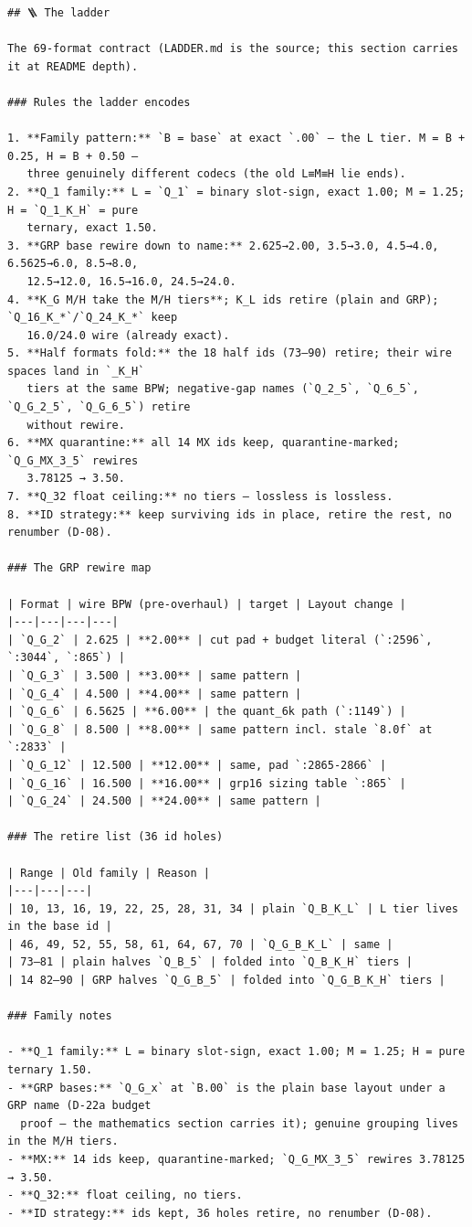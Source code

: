 \begin{Verbatim}[breaklines,breakanywhere,fontsize=\footnotesize]
## 🪜 The ladder

The 69-format contract (LADDER.md is the source; this section carries it at README depth).

### Rules the ladder encodes

1. **Family pattern:** `B = base` at exact `.00` — the L tier. M = B + 0.25, H = B + 0.50 —
   three genuinely different codecs (the old L≡M≡H lie ends).
2. **Q_1 family:** L = `Q_1` = binary slot-sign, exact 1.00; M = 1.25; H = `Q_1_K_H` = pure
   ternary, exact 1.50.
3. **GRP base rewire down to name:** 2.625→2.00, 3.5→3.0, 4.5→4.0, 6.5625→6.0, 8.5→8.0,
   12.5→12.0, 16.5→16.0, 24.5→24.0.
4. **K_G M/H take the M/H tiers**; K_L ids retire (plain and GRP); `Q_16_K_*`/`Q_24_K_*` keep
   16.0/24.0 wire (already exact).
5. **Half formats fold:** the 18 half ids (73–90) retire; their wire spaces land in `_K_H`
   tiers at the same BPW; negative-gap names (`Q_2_5`, `Q_6_5`, `Q_G_2_5`, `Q_G_6_5`) retire
   without rewire.
6. **MX quarantine:** all 14 MX ids keep, quarantine-marked; `Q_G_MX_3_5` rewires
   3.78125 → 3.50.
7. **Q_32 float ceiling:** no tiers — lossless is lossless.
8. **ID strategy:** keep surviving ids in place, retire the rest, no renumber (D-08).

### The GRP rewire map

| Format | wire BPW (pre-overhaul) | target | Layout change |
|---|---|---|---|
| `Q_G_2` | 2.625 | **2.00** | cut pad + budget literal (`:2596`, `:3044`, `:865`) |
| `Q_G_3` | 3.500 | **3.00** | same pattern |
| `Q_G_4` | 4.500 | **4.00** | same pattern |
| `Q_G_6` | 6.5625 | **6.00** | the quant_6k path (`:1149`) |
| `Q_G_8` | 8.500 | **8.00** | same pattern incl. stale `8.0f` at `:2833` |
| `Q_G_12` | 12.500 | **12.00** | same, pad `:2865-2866` |
| `Q_G_16` | 16.500 | **16.00** | grp16 sizing table `:865` |
| `Q_G_24` | 24.500 | **24.00** | same pattern |

### The retire list (36 id holes)

| Range | Old family | Reason |
|---|---|---|
| 10, 13, 16, 19, 22, 25, 28, 31, 34 | plain `Q_B_K_L` | L tier lives in the base id |
| 46, 49, 52, 55, 58, 61, 64, 67, 70 | `Q_G_B_K_L` | same |
| 73–81 | plain halves `Q_B_5` | folded into `Q_B_K_H` tiers |
| 14 82–90 | GRP halves `Q_G_B_5` | folded into `Q_G_B_K_H` tiers |

### Family notes

- **Q_1 family:** L = binary slot-sign, exact 1.00; M = 1.25; H = pure ternary 1.50.
- **GRP bases:** `Q_G_x` at `B.00` is the plain base layout under a GRP name (D-22a budget
  proof — the mathematics section carries it); genuine grouping lives in the M/H tiers.
- **MX:** 14 ids keep, quarantine-marked; `Q_G_MX_3_5` rewires 3.78125 → 3.50.
- **Q_32:** float ceiling, no tiers.
- **ID strategy:** ids kept, 36 holes retire, no renumber (D-08).


\end{Verbatim}

